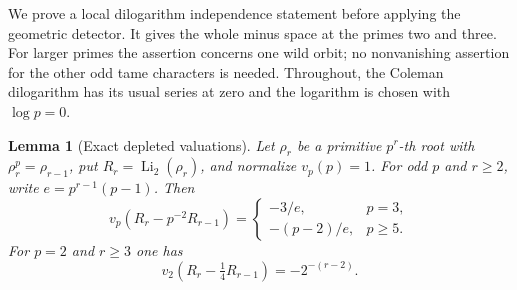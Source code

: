 \documentclass[11pt,a4paper]{article}
\newtheorem{lemma}[theorem]{Lemma}
\theoremstyle{remark}
\begin{document}
We prove a local dilogarithm independence statement before applying the
geometric detector. It gives the whole minus space at the primes two
and three. For larger primes the assertion concerns one wild orbit;
no nonvanishing assertion for the other odd tame characters is needed.
Throughout, the Coleman dilogarithm has its usual series at zero and
the logarithm is chosen with $\log p=0$.

\begin{lemma}[Exact depleted valuations]\label{lem:wilddepletion}
Let $\rho_r$ be a primitive $p^r$-th root with
$\rho_r^p=\rho_{r-1}$, put $R_r=\operatorname{Li}_2(\rho_r)$,
and normalize $v_p(p)=1$.
For odd $p$ and $r\geq2$, write $e=p^{r-1}(p-1)$. Then
\[
 v_p(R_r-p^{-2}R_{r-1})=
 \begin{cases}
 -3/e,&p=3,\\
 -(p-2)/e,&p\geq5.
 \end{cases}
\]
For $p=2$ and $r\geq3$ one has
\[
 v_2(R_r-\tfrac14R_{r-1})=-2^{-(r-2)}.
\]
\end{lemma}
\end{document}
